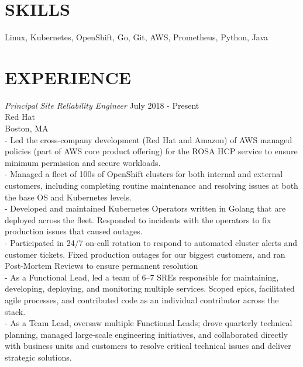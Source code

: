 \documentclass[line,margin]{res}
\begin{document}
\address{fahlmantaylor@gmail.com}
\address{github.com/fahlmant, linkedin.com/in/taylorfahlman}
\begin{resume}

                    
\section{SKILLS}
                    Linux, Kubernetes, OpenShift, Go, Git, AWS, Prometheus, Python, Java
                    
\section{EXPERIENCE}
                    {\sl Principal Site Reliability Engineer} \hfill July 2018 - Present\\
                    Red Hat\\
                    Boston, MA\\
                    - Led the cross-company development (Red Hat and Amazon) of AWS managed policies (part of AWS core product offering) for the ROSA HCP service to ensure minimum permission and secure workloads.\\
                    - Managed a fleet of 100s of OpenShift clusters for both internal and external customers, including completing routine maintenance and resolving issues at both the base OS and Kubernetes levels.\\
                    - Developed and maintained Kubernetes Operators written in Golang that are deployed across the fleet. Responded to incidents with the operators to fix production issues that caused outages.\\
                    - Participated in 24/7 on-call rotation to respond to automated cluster alerts and customer tickets. Fixed production outages for our biggest customers, and ran Post-Mortem Reviews to ensure permanent resolution\\
                    - As a Functional Lead, led a team of 6–7 SREs responsible for maintaining, developing, deploying, and monitoring multiple services. Scoped epics, facilitated agile processes, and contributed code as an individual contributor across the stack. \\
                    - As a Team Lead, oversaw multiple Functional Leads; drove quarterly technical planning, managed large-scale engineering initiatives, and collaborated directly with business units and customers to resolve critical technical issues and deliver strategic solutions. \\

\end{resume}
\end{document}
